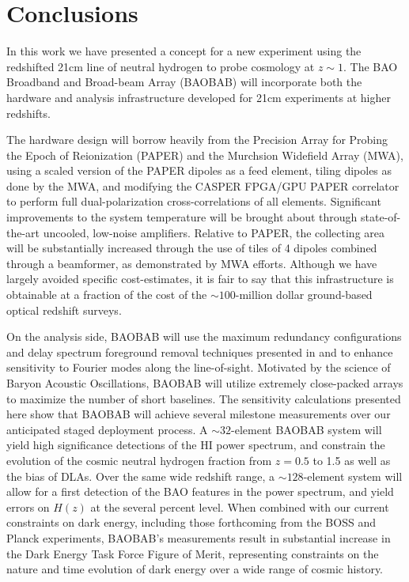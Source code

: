 \documentclass[10pt,iop]{emulateapj}
\begin{document}
\section{Conclusions}
\label{sec:conclusions}

In this work we have presented a concept for a new experiment using the redshifted 21cm 
line of neutral hydrogen to probe cosmology at $z\sim1$.  The BAO Broadband and Broad-beam
Array (BAOBAB) will incorporate both the hardware and analysis infrastructure developed for
21cm experiments at higher redshifts.

The hardware design will borrow heavily from the Precision Array for Probing the Epoch
of Reionization (PAPER) and the Murchsion Widefield Array (MWA), 
using a scaled version of the PAPER dipoles as a feed element, tiling dipoles as done by the MWA,
and modifying the CASPER FPGA/GPU PAPER correlator to perform full
dual-polarization cross-correlations of all elements.  Significant improvements to the
system temperature will be brought about through state-of-the-art uncooled, 
low-noise amplifiers.  Relative to PAPER, the collecting area will be substantially
increased through the use of tiles of 4 dipoles combined through a beamformer, as demonstrated
by MWA efforts.  Although we have largely avoided specific cost-estimates, it is fair to say that
this infrastructure is obtainable at a fraction of the cost of the $\sim100$-million dollar 
ground-based optical redshift surveys.

On the analysis side, BAOBAB will use the maximum redundancy
configurations and delay spectrum foreground removal techniques presented in 
\citet{parsons_et_al_2012a} and \citet{parsons_et_al_2012b} to enhance sensitivity to
Fourier modes along the line-of-sight.  Motivated by the science of Baryon Acoustic Oscillations,
BAOBAB will utilize extremely close-packed arrays to maximize the number of short baselines.
The sensitivity calculations presented here
show that BAOBAB will achieve several milestone measurements over our anticipated staged deployment
process.  A $\sim32$-element BAOBAB system will yield high significance detections of the HI power
spectrum, and constrain the evolution of the cosmic neutral hydrogen fraction from $z = 0.5$ to
1.5 as well as the bias of DLAs.  Over the same wide redshift range, a $\sim128$-element system will allow for a first detection of the BAO features in the
power spectrum, and yield errors on $H(z)$ at the several percent level.  When combined
with our current constraints on dark energy, including those forthcoming from the BOSS and Planck 
experiments,
BAOBAB's measurements result in substantial increase in the Dark Energy Task Force Figure of Merit,
representing constraints on the nature and time evolution of dark energy over a wide range of cosmic history.
\end{document}
